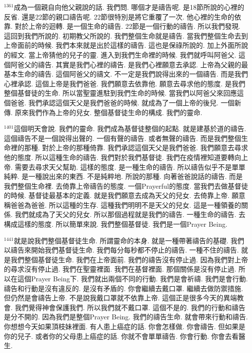 \documentclass{book}
\begin{document}
$^{1361}$成為一個親自向他父親說的話.
我們問.
哪個才是禱告呢.
是18節所說的心裡的反省.
還是22節的親口禱告呢.
22節很特別是將它重覆了一次.
他心裡的生命的依靠.
對於上帝的迴轉.
是一個生命的禱告.
22節是一個行動的禱告.
所以我們發現.
這回到我們所說的.
初期教父所說的.
我們整個生命就是禱告.
當我們整個生命去到上帝面前的時候.
我們本來就是出於這樣的禱告.
這也是保祿所說的.
加上外面所說的經文.
當上帝猜他的兒子的靈.
進入到我們生命裡的時候.
我們就呼叫阿爸父.
這個阿爸父的禱告.
其實是我們心裡的禱告.
是我們心裡願意去承認.
上帝為父親的最基本生命的禱告.
這個阿爸父的禱文.
不一定是我們說得出來的一個禱告.
而是我們心裡承認.
這個上帝是我們爸爸.
我們願意去依靠他.
願意去尋求他的態度.
是我們整個基督徒的生命.
所以當聖靈進駐到我們生命的時候.
當我們以阿爸父來回應這個爸爸.
我們承認這個天父是我們爸爸的時候.
就成為了一個上帝的後兒.
一個新傳.
原來我們作為上帝的兒女.
整個基督徒生命的構成.
我們的靈命.

$^{1401}$這個明天會說.
我們的靈命.
我們成為基督徒整個的起點.
就是建基於道的禱告.
這個禱告不是一個說得出聲的.
一個有聲的禱告.
或者無聲的禱告.
而是我們整個生命裡的那種.
對於上帝的那種倚靠.
我們承認這個天父是我們爸爸.
我們願意去尋求他的態度.
所以這種生命的禱告.
我們對於我們基督徒.
我們在疫情裡知道要轉向上帝.
需要去尋求天父幫助.
這樣的態度.
是一種生命的禱告.
所以禱告似乎不是單單純粹.
是一種說出來的東西.
不是純粹地.
所說的那種.
向著爸爸說話的禱告.
而是我們整個生命裡.
去倚靠上帝禱告的態度.
一個Prayerful的態度.
當我們去做基督徒的時候.
基督徒最基本的定義.
就是我們願意去成為天父的兒女.
去倚靠上帝.
願意稱爸爸為爸爸.
所以這種的生存.
這種我們明明不是天父的兒女.
這是一種領養的關係.
我們就成為了天父的兒女.
所以那個過程就是我們的禱告.
一種生命的禱告.
去構成這樣的態度.
所以簡單來說.
我們整個基督徒.
我們是一個Prayer Being.

$^{1441}$就是說我們整個基督徒生命.
所謂靈命的本身.
就是一種帶著禱告的基礎.
我們以禱告來開始我們基督徒生命.
我們每分每秒都不停止的禱告.
一種不住的禱告.
就是我們整個基督徒生命.
我們在上帝面前.
我們的禱告沒有停止過.
因為我們對上帝的尋求沒有停止過.
我們在聖靈裡面.
我們在基督裡面.
那個關係是沒有停止過.
所以在這個Prayer Being下.
我們就出兩個不同的行動.
我們是會祈禱.
我們是會行動.
禱告和行動是沒有違反的.
是沒有矛盾的.
你會繼續去戴口罩.
繼續去做防禦措施.
但仍然是會禱告上帝.
不是說我戴口罩就不依靠上帝.
這個正是很多今天的異端教會.
我們覺得神會保護我們.
所以我們就不戴口罩.
這個不是的.
我們的行動和禱告是分不開的.
因為我們是整個Prayer Being.
我們的禱告生命.
就會帶來行動和禱告.
你想想今天如果頂枝妹裡面.
有人患上癌症的話.
你會怎樣做.
你會禱告.
但如果是你的兒子.
或者你的父母患上癌症的話.
你就不會單單禱告.
你會行動.
你會去看醫生.
\end{document}
